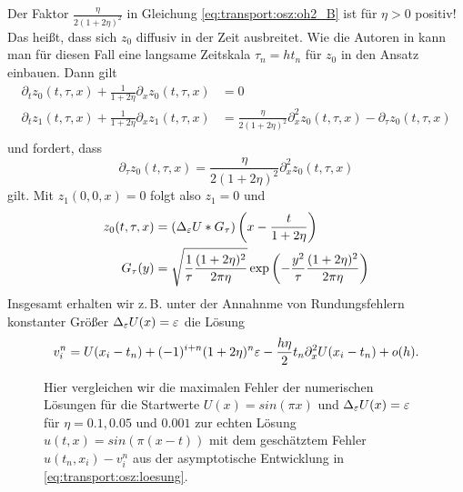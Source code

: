 Der Faktor $\frac{\eta}{2 (1 + 2 \eta)^2}$ in Gleichung \eqref{eq:transport:osz:oh2_B} ist für $\eta > 0$ positiv!
Das heißt, dass sich $z_0$ diffusiv in der Zeit ausbreitet.
Wie die Autoren in \cite{Junk2004} kann man für diesen Fall eine langsame Zeitskala $\tau_n = h t_n$ für $z_0$ in den Ansatz einbauen.
Dann gilt
\begin{align*}
\partial_t z_0(t, \tau, x) + \frac {1} {1 + 2 \eta} \partial_x z_0(t, \tau, x) &= 0\\
\partial_t z_1(t, \tau, x) + \frac {1} {1 + 2 \eta} \partial_x z_1(t, \tau, x) &= \frac{\eta}{2 (1 + 2 \eta)^2} \partial^2_x z_0(t, \tau, x) - \partial_\tau z_0(t, \tau, x)\\
\end{align*}
und fordert, dass
\[ 
\partial_\tau z_0(t, \tau, x) = \frac{\eta}{2 (1 + 2 \eta)^2} \partial^2_x z_0(t, \tau, x) 
\]
gilt. Mit $z_1(0,0,x) = 0$ folgt also $z_1 = 0$ und
\begin{align*}
z_0(t, \tau, x) &= (\Delta_\varepsilon U * G_\tau)\left(x - \frac{t}{1 + 2 \eta} \right) \\
G_\tau(y) &= \sqrt {\frac{1}{\tau} \frac {(1 + 2 \eta)^2}{2 \pi \eta}} \exp\left( - \frac{y^2}{\tau} \frac {(1 + 2 \eta)^2}{2 \pi \eta} \right)
\end{align*}
Insgesamt erhalten wir z.\,B. unter der Annahnme von Rundungsfehlern konstanter Größer $\Delta_\varepsilon U(x) = \varepsilon$ die Lösung
\begin{align}\label{eq:transport:osz:loesung}
v^n_i = U(x_i - t_n) + (-1)^{i+n} (1 + 2 \eta)^n \varepsilon - \frac{h\eta} 2 t_n \partial^2_x U(x_i - t_n) + o(h).
\end{align}
 
\begin{figure}
\centering
{}
\caption{Hier vergleichen wir die maximalen Fehler der numerischen Lösungen für die Startwerte $U(x) = sin(\pi x)$ und $\Delta_\varepsilon U(x) = \varepsilon$ für $\eta = 0.1, 0.05$ und $0.001$ zur echten Lösung $u(t,x) = sin(\pi(x - t))$ mit dem geschätztem Fehler $u(t_n, x_i) - v^n_i$ aus der asymptotische Entwicklung in \eqref{eq:transport:osz:loesung}.}
\label{fig:transport:osz:max_error}
\end{figure}

